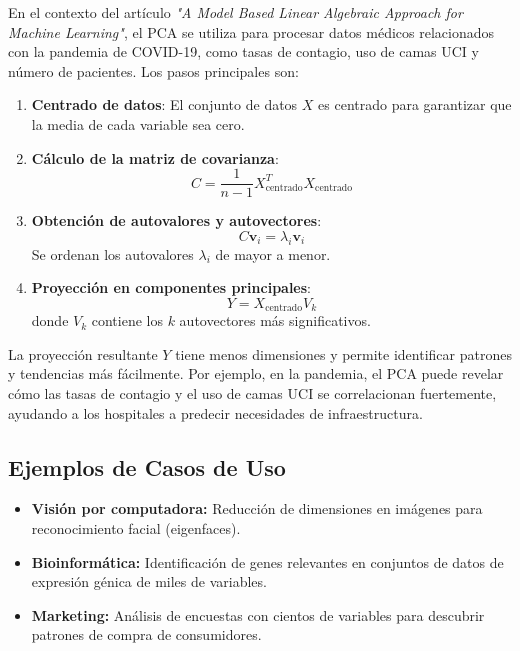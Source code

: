 \documentclass[12pt]{article}
\begin{document}
        \vspace{1em}
        \noindent
        En el contexto del artículo \emph{"A Model Based Linear Algebraic Approach for Machine Learning"}, el PCA se utiliza para procesar datos médicos relacionados con la pandemia de COVID-19, como tasas de contagio, uso de camas UCI y número de pacientes. Los pasos principales son:
        \begin{enumerate}
                \item \textbf{Centrado de datos}: El conjunto de datos $ X $ es centrado para garantizar que la media de cada variable sea cero.
                \item \textbf{Cálculo de la matriz de covarianza}:
                \[
                C = \frac{1}{n-1} X_{\text{centrado}}^T X_{\text{centrado}}
                \]
                \item \textbf{Obtención de autovalores y autovectores}: 
                \[
                C \mathbf{v}_i = \lambda_i \mathbf{v}_i
                \]
                Se ordenan los autovalores $\lambda_i$ de mayor a menor.
                \item \textbf{Proyección en componentes principales}:
                \[
                Y = X_{\text{centrado}} V_k
                \]
                donde $ V_k $ contiene los $ k $ autovectores más significativos.
        \end{enumerate}
        
        \vspace{1em}
        \noindent
        La proyección resultante $ Y $ tiene menos dimensiones y permite identificar patrones y tendencias más fácilmente. Por ejemplo, en la pandemia, el PCA puede revelar cómo las tasas de contagio y el uso de camas UCI se correlacionan fuertemente, ayudando a los hospitales a predecir necesidades de infraestructura.
        
        \subsection*{Ejemplos de Casos de Uso}
        \begin{itemize}
                \item \textbf{Visión por computadora:} Reducción de dimensiones en imágenes para reconocimiento facial (eigenfaces).
                \item \textbf{Bioinformática:} Identificación de genes relevantes en conjuntos de datos de expresión génica de miles de variables.
                \item \textbf{Marketing:} Análisis de encuestas con cientos de variables para descubrir patrones de compra de consumidores.
        \end{itemize}
        
\end{document}
